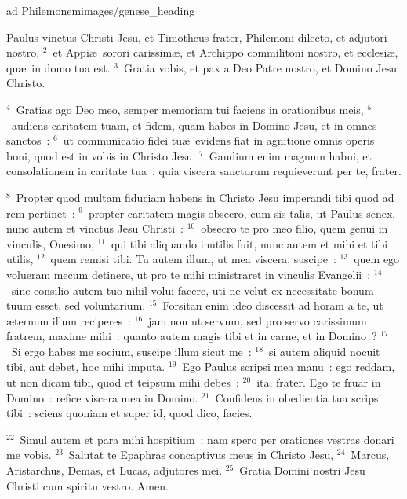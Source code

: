 {ad Philemonem}{images/genese_heading}

\noindent Paulus vinctus Christi Jesu, et Timotheus frater, Philemoni dilecto, et adjutori nostro,
${}^{2}$~et Appi\ae\ sorori carissim\ae , et Archippo commilitoni nostro, et ecclesi\ae , qu\ae\ in domo tua est.
${}^{3}$~Gratia vobis, et pax a Deo Patre nostro, et Domino Jesu Christo.


${}^{4}$~Gratias ago Deo meo, semper memoriam tui faciens in orationibus meis,
${}^{5}$~audiens caritatem tuam, et fidem, quam habes in Domino Jesu, et in omnes sanctos~:
${}^{6}$~ut communicatio fidei tu\ae\ evidens fiat in agnitione omnis operis boni, quod est in vobis in Christo Jesu.
${}^{7}$~Gaudium enim magnum habui, et consolationem in caritate tua~: quia viscera sanctorum requieverunt per te, frater.


${}^{8}$~Propter quod multam fiduciam habens in Christo Jesu imperandi tibi quod ad rem pertinet~:
${}^{9}$~propter caritatem magis obsecro, cum sis talis, ut Paulus senex, nunc autem et vinctus Jesu Christi~:
${}^{10}$~obsecro te pro meo filio, quem genui in vinculis, Onesimo,
${}^{11}$~qui tibi aliquando inutilis fuit, nunc autem et mihi et tibi utilis,
${}^{12}$~quem remisi tibi. Tu autem illum, ut mea viscera, suscipe~:
${}^{13}$~quem ego volueram mecum detinere, ut pro te mihi ministraret in vinculis Evangelii~:
${}^{14}$~sine consilio autem tuo nihil volui facere, uti ne velut ex necessitate bonum tuum esset, sed voluntarium.
${}^{15}$~Forsitan enim ideo discessit ad horam a te, ut \ae ternum illum reciperes~:
${}^{16}$~jam non ut servum, sed pro servo carissimum fratrem, maxime mihi~: quanto autem magis tibi et in carne, et in Domino~?
${}^{17}$~Si ergo habes me socium, suscipe illum sicut me~:
${}^{18}$~si autem aliquid nocuit tibi, aut debet, hoc mihi imputa.
${}^{19}$~Ego Paulus scripsi mea manu~: ego reddam, ut non dicam tibi, quod et teipsum mihi debes~:
${}^{20}$~ita, frater. Ego te fruar in Domino~: refice viscera mea in Domino.
${}^{21}$~Confidens in obedientia tua scripsi tibi~: sciens quoniam et super id, quod dico, facies.


${}^{22}$~Simul autem et para mihi hospitium~: nam spero per orationes vestras donari me vobis.
${}^{23}$~Salutat te Epaphras concaptivus meus in Christo Jesu,
${}^{24}$~Marcus, Aristarchus, Demas, et Lucas, adjutores mei.
${}^{25}$~Gratia Domini nostri Jesu Christi cum spiritu vestro. Amen.
